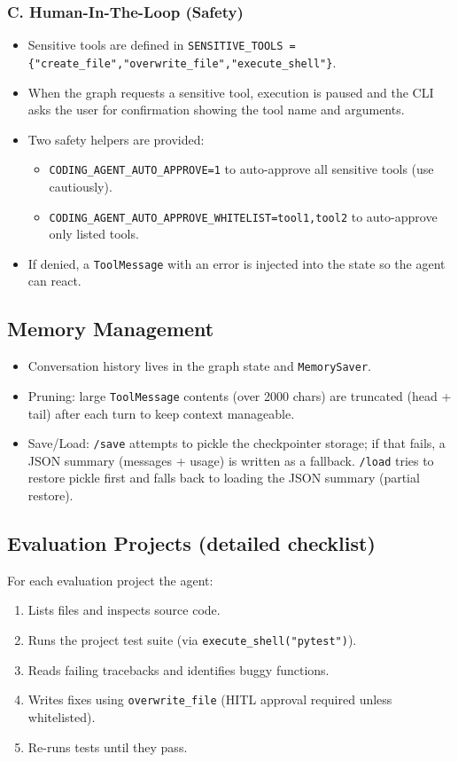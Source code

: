 \documentclass[12pt, a4paper]{article}
\begin{document}
\subsubsection{C. Human-In-The-Loop (Safety)}
\begin{itemize}
  \item Sensitive tools are defined in \texttt{SENSITIVE\_TOOLS = \{"create\_file","overwrite\_file","execute\_shell"\}}.
  \item When the graph requests a sensitive tool, execution is paused and the CLI asks the user for confirmation showing the tool name and arguments.
  \item Two safety helpers are provided:
    \begin{itemize}
      \item \texttt{CODING\_AGENT\_AUTO\_APPROVE=1} to auto-approve all sensitive tools (use cautiously).
      \item \texttt{CODING\_AGENT\_AUTO\_APPROVE\_WHITELIST=tool1,tool2} to auto-approve only listed tools.
    \end{itemize}
  \item If denied, a \texttt{ToolMessage} with an error is injected into the state so the agent can react.
\end{itemize}

\subsection{Memory Management}
\begin{itemize}
  \item Conversation history lives in the graph state and \texttt{MemorySaver}.
  \item Pruning: large \texttt{ToolMessage} contents (over 2000 chars) are truncated (head + tail) after each turn to keep context manageable.
  \item Save/Load: \texttt{/save} attempts to pickle the checkpointer storage; if that fails, a JSON summary (messages + usage) is written as a fallback. \texttt{/load} tries to restore pickle first and falls back to loading the JSON summary (partial restore).
\end{itemize}

\subsection{Evaluation Projects (detailed checklist)}
For each evaluation project the agent:
\begin{enumerate}
  \item Lists files and inspects source code.
  \item Runs the project test suite (via \texttt{execute\_shell("pytest")}).
  \item Reads failing tracebacks and identifies buggy functions.
  \item Writes fixes using \texttt{overwrite\_file} (HITL approval required unless whitelisted).
  \item Re-runs tests until they pass.
\end{enumerate}
\end{document}

